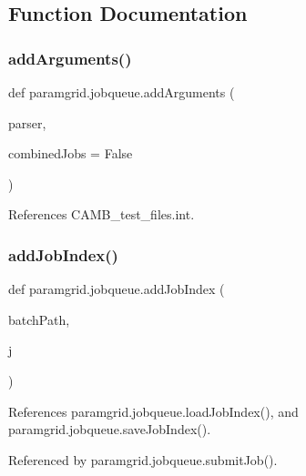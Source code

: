 \subsection{Function Documentation}
\mbox{\label{namespaceparamgrid_1_1jobqueue_a4119e59674e8fdbc2bf79d63df03efeb}} 
\subsubsection{\texorpdfstring{add\+Arguments()}{addArguments()}}
{\footnotesize\ttfamily def paramgrid.\+jobqueue.\+add\+Arguments (\begin{DoxyParamCaption}\item[{}]{parser,  }\item[{}]{combined\+Jobs = {\ttfamily False} }\end{DoxyParamCaption})}



References C\+A\+M\+B\+\_\+test\+\_\+files.\+int.

\mbox{\label{namespaceparamgrid_1_1jobqueue_a52e2a5b1c164e5eb20746d45d7005621}} 
\subsubsection{\texorpdfstring{add\+Job\+Index()}{addJobIndex()}}
{\footnotesize\ttfamily def paramgrid.\+jobqueue.\+add\+Job\+Index (\begin{DoxyParamCaption}\item[{}]{batch\+Path,  }\item[{}]{j }\end{DoxyParamCaption})}



References paramgrid.\+jobqueue.\+load\+Job\+Index(), and paramgrid.\+jobqueue.\+save\+Job\+Index().



Referenced by paramgrid.\+jobqueue.\+submit\+Job().

